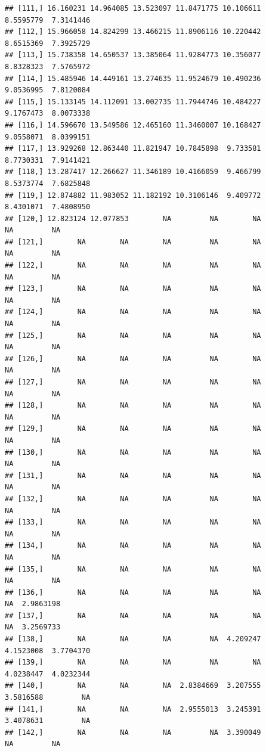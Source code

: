 \documentclass{article}\usepackage[]{graphicx}\usepackage[]{color}
\makeatletter
\newenvironment{kframe}{%
 \def\at@end@of@kframe{}%
 \ifinner\ifhmode%
  \def\at@end@of@kframe{\end{minipage}}%
  \begin{minipage}{\columnwidth}%
 \fi\fi%
 \def\FrameCommand##1{\hskip\@totalleftmargin \hskip-\fboxsep
 \colorbox{shadecolor}{##1}\hskip-\fboxsep
     \hskip-\linewidth \hskip-\@totalleftmargin \hskip\columnwidth}%
 \MakeFramed {\advance\hsize-\width
   \@totalleftmargin\z@ \linewidth\hsize
   \@setminipage}}%
 {\par\unskip\endMakeFramed%
 \at@end@of@kframe}
\newenvironment{knitrout}{}{} %
\makeatother
\begin{document}
\begin{knitrout}
\begin{kframe}
\begin{verbatim}
## [111,] 16.160231 14.964085 13.523097 11.8471775 10.106611  8.5595779  7.3141446
## [112,] 15.966058 14.824299 13.466215 11.8906116 10.220442  8.6515369  7.3925729
## [113,] 15.738358 14.650537 13.385064 11.9284773 10.356077  8.8328323  7.5765972
## [114,] 15.485946 14.449161 13.274635 11.9524679 10.490236  9.0536995  7.8120084
## [115,] 15.133145 14.112091 13.002735 11.7944746 10.484227  9.1767473  8.0073338
## [116,] 14.596670 13.549586 12.465160 11.3460007 10.168427  9.0558071  8.0399151
## [117,] 13.929268 12.863440 11.821947 10.7845898  9.733581  8.7730331  7.9141421
## [118,] 13.287417 12.266627 11.346189 10.4166059  9.466799  8.5373774  7.6825848
## [119,] 12.874882 11.983052 11.182192 10.3106146  9.409772  8.4301071  7.4808950
## [120,] 12.823124 12.077853        NA         NA        NA         NA         NA
## [121,]        NA        NA        NA         NA        NA         NA         NA
## [122,]        NA        NA        NA         NA        NA         NA         NA
## [123,]        NA        NA        NA         NA        NA         NA         NA
## [124,]        NA        NA        NA         NA        NA         NA         NA
## [125,]        NA        NA        NA         NA        NA         NA         NA
## [126,]        NA        NA        NA         NA        NA         NA         NA
## [127,]        NA        NA        NA         NA        NA         NA         NA
## [128,]        NA        NA        NA         NA        NA         NA         NA
## [129,]        NA        NA        NA         NA        NA         NA         NA
## [130,]        NA        NA        NA         NA        NA         NA         NA
## [131,]        NA        NA        NA         NA        NA         NA         NA
## [132,]        NA        NA        NA         NA        NA         NA         NA
## [133,]        NA        NA        NA         NA        NA         NA         NA
## [134,]        NA        NA        NA         NA        NA         NA         NA
## [135,]        NA        NA        NA         NA        NA         NA         NA
## [136,]        NA        NA        NA         NA        NA         NA  2.9863198
## [137,]        NA        NA        NA         NA        NA         NA  3.2569733
## [138,]        NA        NA        NA         NA  4.209247  4.1523008  3.7704370
## [139,]        NA        NA        NA         NA        NA  4.0238447  4.0232344
## [140,]        NA        NA        NA  2.8384669  3.207555  3.5816588         NA
## [141,]        NA        NA        NA  2.9555013  3.245391  3.4078631         NA
## [142,]        NA        NA        NA         NA  3.390049         NA         NA

\end{verbatim}
\end{kframe}
\end{knitrout}
\end{document}
